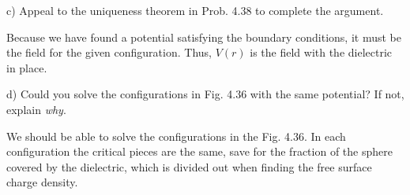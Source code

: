 \documentclass[12pt,a4paper]{article}
\begin{document}
c) Appeal to the uniqueness theorem in Prob. 4.38 to complete the argument.

Because we have found a potential satisfying the boundary conditions, it must be the field for the given configuration. Thus, $V(r)$ is the field with the dielectric in place.

d) Could you solve the configurations in Fig. 4.36 with the same potential? If not, explain \textit{why}.

We should be able to solve the configurations in the Fig. 4.36. In each configuration the critical pieces are the same, save for the fraction of the sphere covered by the dielectric, which is divided out when finding the free surface charge density.
\end{document}

